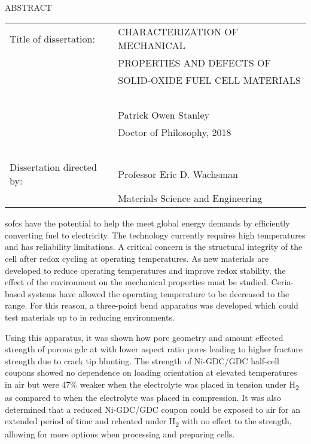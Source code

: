 
\hbox{\ }

\renewcommand{\baselinestretch}{1}
\small \normalsize

\begin{center}
\large{{ABSTRACT}}

\vspace{3em}

\end{center}
\hspace{-.15in}
\begin{tabular}{ll}
Title of dissertation:    & {\large  CHARACTERIZATION OF MECHANICAL}\\
&				      {\large  PROPERTIES AND DEFECTS OF  } \\
&				      {\large  SOLID-OXIDE FUEL CELL MATERIALS } \\
\ \\
&                          {\large  Patrick Owen Stanley} \\
&                           {\large Doctor of Philosophy, 2018}\\
\ \\
Dissertation directed by: & {\large  Professor Eric D. Wachsman} \\
&  				{\large	 Materials Science and Engineering } \\
\end{tabular}

\vspace{3em}

\renewcommand{\baselinestretch}{2}
\large \normalsize


\Glspl{sofc} have the potential to help the meet global energy demands by efficiently converting fuel to electricity.
The technology currently requires high temperatures and has reliability limitations.
A critical concern is the structural integrity of the cell after redox cycling at operating temperatures.
As new materials are developed to reduce operating temperatures and improve redox stability, the effect of the environment on the mechanical properties must be studied.
Ceria-based systems have allowed the operating temperature to be decreased to the  range.
For this reason, a three-point bend apparatus was developed which could test materials up to  in reducing environments.

Using this apparatus, it was shown how pore geometry and amount effected strength of porous \gls{gdc} at  with lower aspect ratio pores leading to higher fracture strength due to crack tip blunting.
The strength of Ni-GDC/GDC half-cell coupons showed no dependence on loading orientation at elevated temperatures in air but were 47\% weaker when the electrolyte was placed in tension under H\textsubscript{2} as compared to when the electrolyte was placed in compression.
It was also determined that a reduced Ni-GDC/GDC coupon could be exposed to air for an extended period of time and reheated under H\textsubscript{2} with no effect to the strength, allowing for more options when processing and preparing cells.

